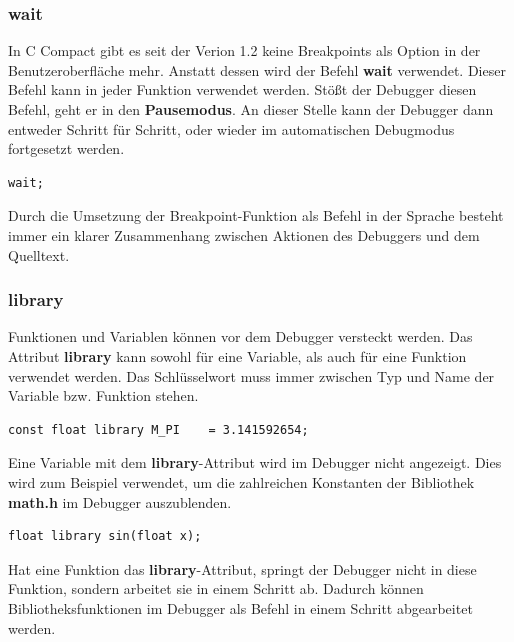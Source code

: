 \subsubsection*{wait}
In C Compact gibt es seit der Verion 1.2 keine Breakpoints als Option in der Benutzeroberfläche mehr. Anstatt dessen wird der Befehl \textbf{wait} verwendet. Dieser Befehl kann in jeder Funktion verwendet werden. Stößt der Debugger diesen Befehl, geht er in den \textbf{Pausemodus}. An dieser Stelle kann der Debugger dann entweder Schritt für Schritt, oder wieder im automatischen Debugmodus fortgesetzt werden.

\begin{lstlisting}[language=CMM]
wait;
\end{lstlisting}

Durch die Umsetzung der Breakpoint-Funktion als Befehl in der Sprache besteht immer ein klarer Zusammenhang zwischen Aktionen des Debuggers und dem Quelltext.

\subsubsection*{library}
Funktionen und Variablen können vor dem Debugger \glqq{}versteckt\grqq{} werden. Das Attribut \textbf{library} kann sowohl für eine Variable, als auch für eine Funktion verwendet werden. Das Schlüsselwort muss immer zwischen Typ und Name der Variable bzw. Funktion stehen.

\begin{lstlisting}[language=CMM]
const float library M_PI    = 3.141592654;
\end{lstlisting}
Eine Variable mit dem \textbf{library}-Attribut wird im Debugger nicht angezeigt. Dies wird zum Beispiel verwendet, um die zahlreichen Konstanten der Bibliothek \textbf{math.h} im Debugger auszublenden.

\begin{lstlisting}[language=CMM]
float library sin(float x);
\end{lstlisting}
Hat eine Funktion das \textbf{library}-Attribut, springt der Debugger nicht in diese Funktion, sondern arbeitet sie in einem Schritt ab. Dadurch können Bibliotheksfunktionen im Debugger als Befehl in einem Schritt abgearbeitet werden.
